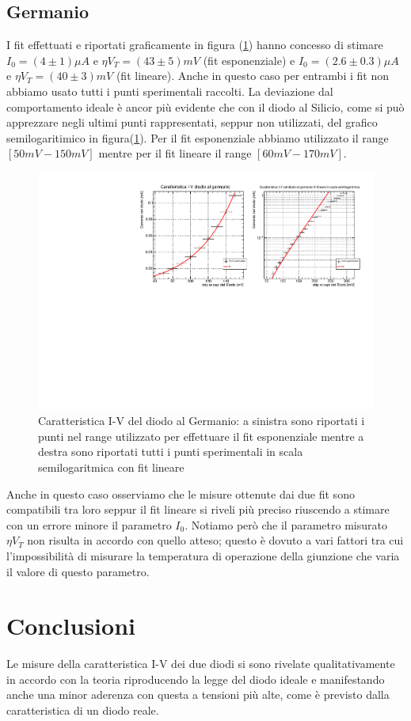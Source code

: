 \documentclass[]{article}
\begin{document}
\subsection{Germanio}
I fit effettuati e riportati graficamente in figura (\ref{fig:germanio}) hanno concesso di stimare $I_0=(4\pm1)\mu A$ e $\eta V_T=(43\pm5)mV$ (fit esponenziale) e $I_0=(2.6\pm0.3)\mu A$ e $\eta V_T=(40\pm3)mV$ (fit lineare). Anche in questo caso per entrambi i fit non abbiamo usato tutti i punti sperimentali raccolti. La deviazione dal comportamento ideale è ancor più evidente che con il diodo al Silicio, come si può apprezzare negli ultimi punti rappresentati, seppur non utilizzati, del grafico semilogaritimico in figura(\ref{fig:germanio}).
Per il fit esponenziale abbiamo utilizzato il range $[50mV-150mV]$ mentre per il fit lineare il range $[60mV-170mV]$.
\begin{figure}[H]
	\centering
	\includegraphics[width=0.8\linewidth]{../Germanio/canvas}
	\caption{Caratteristica I-V del diodo al Germanio: a sinistra sono riportati i punti nel range utilizzato per effettuare il fit esponenziale mentre a destra sono riportati tutti i punti sperimentali in scala semilogaritmica con fit lineare}
	\label{fig:germanio}
\end{figure}
Anche in questo caso osserviamo che le misure ottenute dai due fit sono compatibili tra loro seppur il fit lineare si riveli più preciso riuscendo a stimare con un errore minore il parametro $I_0$.
Notiamo però che il parametro misurato $\eta V_T$ non risulta in accordo con quello atteso; questo è dovuto a vari fattori tra cui l'impossibilità di misurare la temperatura di operazione della giunzione che varia il valore di questo parametro.
\section*{Conclusioni}
Le misure della caratteristica I-V dei due diodi si sono rivelate qualitativamente in accordo con la teoria riproducendo la legge del diodo ideale e manifestando anche una minor aderenza con questa a tensioni più alte, come è previsto dalla caratteristica di un diodo reale. 
\end{document}
